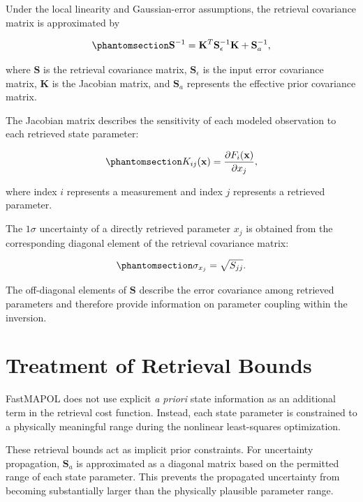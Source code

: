 \documentclass[
  11pt,
  letterpaper,
]{scrreprt}
\begin{document}
Under the local linearity and Gaussian-error assumptions, the retrieval
covariance matrix is approximated by

\begin{equation}\phantomsection\label{eq-uq-propagation}{
\mathbf{S}^{-1}
=
\mathbf{K}^T
\mathbf{S}_{\epsilon}^{-1}
\mathbf{K}
+
\mathbf{S}_{a}^{-1},
}\end{equation}

where \(\mathbf{S}\) is the retrieval covariance matrix,
\(\mathbf{S}_{\epsilon}\) is the input error covariance matrix,
\(\mathbf{K}\) is the Jacobian matrix, and \(\mathbf{S}_{a}\) represents
the effective prior covariance matrix.

The Jacobian matrix describes the sensitivity of each modeled
observation to each retrieved state parameter:

\begin{equation}\phantomsection\label{eq-uq-jacobian}{
K_{ij}(\mathbf{x})
=
\frac{\partial F_i(\mathbf{x})}{\partial x_j},
}\end{equation}

where index \(i\) represents a measurement and index \(j\) represents a
retrieved parameter.

The \(1\sigma\) uncertainty of a directly retrieved parameter \(x_j\) is
obtained from the corresponding diagonal element of the retrieval
covariance matrix:

\begin{equation}\phantomsection\label{eq-uq-state}{
\sigma_{x_j}
=
\sqrt{S_{jj}}.
}\end{equation}

The off-diagonal elements of \(\mathbf{S}\) describe the error
covariance among retrieved parameters and therefore provide information
on parameter coupling within the inversion.

\section{Treatment of Retrieval
Bounds}\label{treatment-of-retrieval-bounds}

FastMAPOL does not use explicit \emph{a priori} state information as an
additional term in the retrieval cost function. Instead, each state
parameter is constrained to a physically meaningful range during the
nonlinear least-squares optimization.

These retrieval bounds act as implicit prior constraints. For
uncertainty propagation, \(\mathbf{S}_{a}\) is approximated as a
diagonal matrix based on the permitted range of each state parameter.
This prevents the propagated uncertainty from becoming substantially
larger than the physically plausible parameter range.
\end{document}
